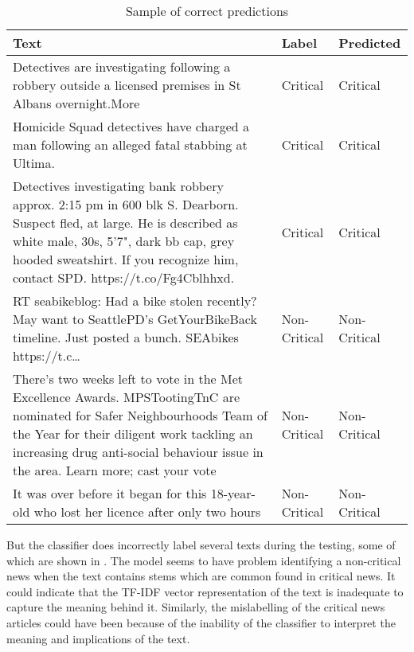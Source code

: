 \begin{table}
\begin{center}
\caption{Sample of correct predictions}
\label{tbl:correct_predictions}
\begin{tabular}{p{10cm}p{2cm}p{2cm}}
\toprule 
Text&Label&Predicted\\
\midrule 
Detectives are investigating following a robbery outside a licensed premises in St Albans overnight.More &Critical&Critical\\
\hline
Homicide Squad detectives have charged a man following an alleged fatal stabbing at Ultima.&Critical&Critical\\
\hline
Detectives investigating bank robbery approx. 2:15 pm in 600 blk S. Dearborn.  Suspect fled, at large. He is described as white male, 30s, 5'7", dark bb cap, grey hooded sweatshirt. If you recognize him, contact SPD. https://t.co/Fg4Cblhhxd.&Critical&Critical\\
\hline
RT seabikeblog: Had a bike stolen recently? May want to SeattlePD’s GetYourBikeBack timeline. Just posted a bunch. SEAbikes https://t.c…
&Non-Critical&Non-Critical\\
\hline
There's two weeks left to vote in the Met Excellence Awards. MPSTootingTnC are nominated for Safer Neighbourhoods Team of the Year for their diligent work tackling an increasing drug anti-social behaviour issue in the area. Learn more; cast your vote&Non-Critical&Non-Critical\\
\hline
It was over before it began for this 18-year-old who lost her licence after only two hours&Non-Critical&Non-Critical\\
\bottomrule
\end{tabular}
\end{center}
\end{table}

But the classifier does incorrectly label several texts during the testing, some of which are shown in . The model seems to have problem identifying a non-critical news when the text contains stems which are common found in critical news. It could indicate that the TF-IDF vector representation of the text is inadequate to capture the meaning behind it. Similarly, the mislabelling of the critical news articles could have been because of the inability of the classifier to interpret the meaning and implications of the text.

